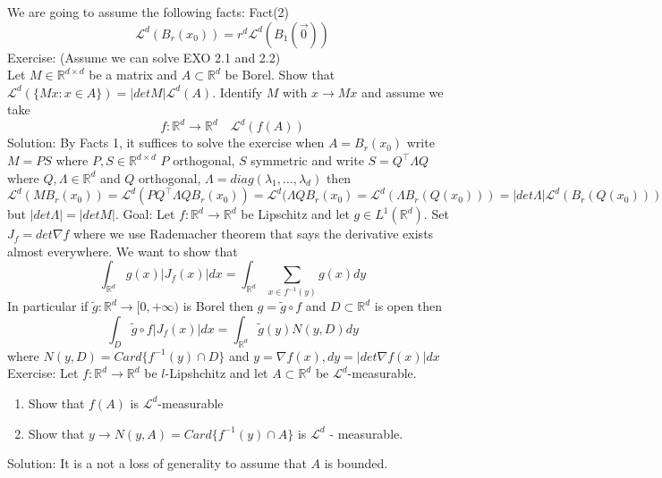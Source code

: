 \documentclass[11pt]{article}
\begin{document}
We are going to assume the following facts:
Fact(2)
\[
\mathcal{L}^{d}( B_r(x_0)) = r^{d} \mathcal{L}^{d}(B_1( \vec 0))
\] 
Exercise: (Assume we can solve EXO 2.1 and 2.2)\\
Let $M \in \mathbb{R}^{d \times d}$ be a matrix and $A \subset \mathbb{R}^{d}$ be Borel. Show that $ \mathcal{L}^{d}( \{ Mx : x \in A\}) = | det M| \mathcal{L}^{d}(A)$.
Identify $M$ with  $x \to Mx$ and assume we take
\[
f : \mathbb{R}^{d} \to \mathbb{R}^{d} \quad \mathcal{L}^{d}(f(A))
\] 
Solution: By Facts 1, it suffices to solve the exercise when $A = B_r(x_0)$ write $M = PS$ where  $P, S \in \mathbb{R}^{d \times d}$ $P$ orthogonal,  $S$ symmetric
and write  $S = Q^{\top} \Lambda Q$ where $Q, \Lambda \in \mathbb{R}^{d}$ and $Q$ orthogonal,  $\Lambda = diag(\lambda_1,\dots,\lambda_d)$ then
\[
\mathcal{L}^{d}(M B_r(x_0)) = \mathcal{L}^{d}( P Q^{\top} \Lambda Q B_r(x_0)) = \mathcal{L}^{d}(\Lambda Q B_r(x_0) = \mathcal{L}^{d}( \Lambda B_r(Q(x_0))) = |det \Lambda| \mathcal{L}^{d}(B_r(Q(x_0))) 
\] 
but $|det \Lambda| = |det M|$.
Goal: Let  $f : \mathbb{R}^{d} \to \mathbb{R}^{d}$ be Lipschitz and let $g \in  L^{1}(\mathbb{R}^{d})$. Set $J_f = det \nabla f$ where we use Rademacher theorem that says the derivative
exists almost everywhere. We want to show that
 \[
\int_{ \mathbb{R}^{d}}^{}g(x) |J_f(x)| dx  = \int_{ \mathbb{R}^{d}}^{} \sum_{x \in f^{-1}(y)}^{}g(x) dy
\] 
In particular if $\tilde g : \mathbb{R}^{d} \to [0,+\infty)$ is Borel then $g = \tilde g \circ f$ and  $D \subset \mathbb{R}^{d}$ is open then
\[
\int_{ D}^{} \tilde g \circ f |J_f(x)| dx = \int_{ \mathbb{R}^{d}}^{}\tilde g(y) N(y,D) dy
\] 
where $N(y,D) = Card\{f^{-1}(y) \cap D\}$ and $y = \nabla f(x), dy = |det \nabla f(x)|dx$\\
Exercise: Let  $f : \mathbb{R}^{d} \to \mathbb{R}^{d}$ be $l$-Lipshchitz and let  $A \subset \mathbb{R}^{d}$ be  $ \mathcal{L}^{d}$-measurable.
\begin{enumerate}
    \item Show that $f(A) $ is  $ \mathcal{L}^{d}$-measurable
    \item Show that $y \to N(y,A) = Card\{f^{-1}(y) \cap A\}$ is $ \mathcal{L}^{d}$ - measurable.
\end{enumerate}
Solution: It is a not a loss of generality to assume that $A$ is bounded.
\end{document}
